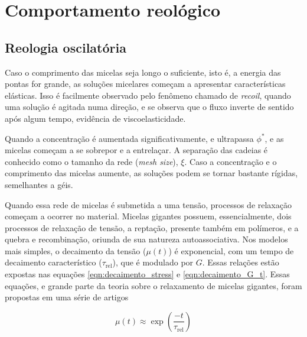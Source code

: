 		\section{Comportamento reológico}
		
		\subsection{Reologia oscilatória} 
		\label{sec:teo_reologia_oscilatoria}
		Caso o comprimento das micelas seja longo o suficiente, isto é, a energia das pontas for grande, as soluções micelares começam a apresentar características elásticas. Isso é facilmente observado pelo fenômeno chamado de \emph{recoil}, quando uma solução é agitada numa direção, e se observa que o fluxo inverte de sentido após algum tempo, evidência de viscoelasticidade.\cite{Hoffmann1988a}
		
		Quando a concentração é aumentada significativamente, e ultrapassa \(\phi^*\), e as micelas começam a se sobrepor e a entrelaçar.\cite{Cates1990} A separação das cadeias é conhecido como o tamanho da rede (\emph{mesh size}), \(\xi\). Caso a concentração e o comprimento das micelas aumente, as soluções podem se tornar bastante rígidas, semelhantes a géis. 

		Quando essa rede de micelas é submetida a uma tensão, processos de relaxação começam a ocorrer no material. Micelas gigantes possuem, essencialmente, dois processos de relaxação de tensão, a reptação, presente também em polímeros, e a quebra e recombinação, oriunda de sua natureza autoassociativa.\cite{Cates1990} Nos modelos mais simples, o decaimento da tensão (\(\mu(t)\)) é exponencial, com um tempo de decaimento característico (\(\tau_{\mathrm{rel}}\)), que é modulado por \(G\). Essas relações estão expostas nas equações \ref{eqn:decaimento_stress}\cite{Cates1990} e \ref{eqn:decaimento_G_t}\cite{Cates2006}. Essas equações, e grande parte da teoria sobre o relaxamento de micelas gigantes, foram propostas em uma série de artigos \cite{Cates1987, Cates1990}
		
		
		\begin{equation}
			\mu(t)  \approx \exp \left(  \frac{-t}{\tau_{\mathrm{rel}}} \right)
			\label{eqn:decaimento_stress}
		\end{equation} %
		
